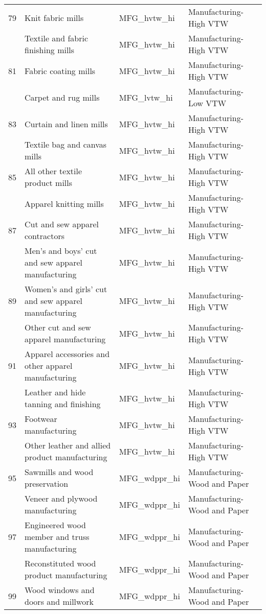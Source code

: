 \begin{landscape}
\begin{small}
\begin{longtable}{clll}
79 & Knit fabric mills & MFG\_hvtw\_hi & Manufacturing-High VTW \\
\gray 80 & Textile and fabric finishing mills & MFG\_hvtw\_hi & Manufacturing-High VTW \\
81 & Fabric coating mills & MFG\_hvtw\_hi & Manufacturing-High VTW \\
\gray 82 & Carpet and rug mills & MFG\_lvtw\_hi & Manufacturing-Low VTW \\
83 & Curtain and linen mills & MFG\_hvtw\_hi & Manufacturing-High VTW \\
\gray 84 & Textile bag and canvas mills & MFG\_hvtw\_hi & Manufacturing-High VTW \\
85 & All other textile product mills & MFG\_hvtw\_hi & Manufacturing-High VTW \\
\gray 86 & Apparel knitting mills & MFG\_hvtw\_hi & Manufacturing-High VTW \\
87 & Cut and sew apparel contractors & MFG\_hvtw\_hi & Manufacturing-High VTW \\
\gray 88 & Men's and boys' cut and sew apparel manufacturing & MFG\_hvtw\_hi & Manufacturing-High VTW \\
89 & Women's and girls' cut and sew apparel manufacturing & MFG\_hvtw\_hi & Manufacturing-High VTW \\
\gray 90 & Other cut and sew apparel manufacturing & MFG\_hvtw\_hi & Manufacturing-High VTW \\
91 & Apparel accessories and other apparel manufacturing & MFG\_hvtw\_hi & Manufacturing-High VTW \\
\gray 92 & Leather and hide tanning and finishing & MFG\_hvtw\_hi & Manufacturing-High VTW \\
93 & Footwear manufacturing & MFG\_hvtw\_hi & Manufacturing-High VTW \\
\gray 94 & Other leather and allied product manufacturing & MFG\_hvtw\_hi & Manufacturing-High VTW \\
95 & Sawmills and wood preservation & MFG\_wdppr\_hi & Manufacturing-Wood and Paper \\
\gray 96 & Veneer and plywood manufacturing & MFG\_wdppr\_hi & Manufacturing-Wood and Paper \\
97 & Engineered wood member and truss manufacturing & MFG\_wdppr\_hi & Manufacturing-Wood and Paper \\
\gray 98 & Reconstituted wood product manufacturing & MFG\_wdppr\_hi & Manufacturing-Wood and Paper \\
99 & Wood windows and doors and millwork & MFG\_wdppr\_hi & Manufacturing-Wood and Paper \\

\end{longtable}
\end{small}
\end{landscape}
